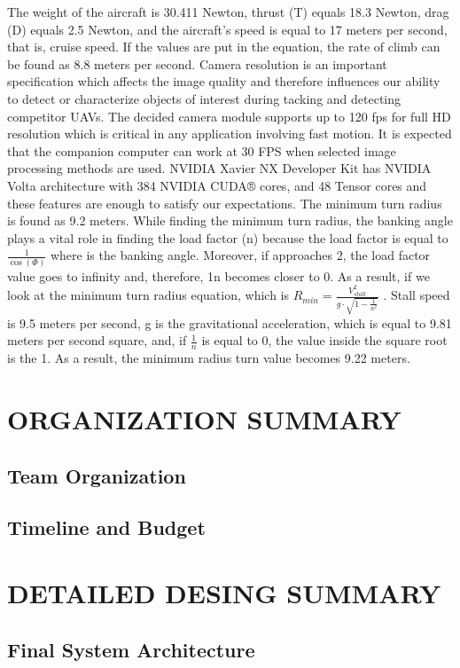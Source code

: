 \documentclass[12pt]{article}
\begin{document}
The weight of the aircraft is 30.411 Newton, thrust (T) equals 18.3 Newton, drag (D) equals 2.5 Newton, and the aircraft's speed is equal to 17 meters per second, that is, cruise speed. If the values are put in the equation, the rate of climb can be found as 8.8 meters per second.
\justify
Camera resolution is an important specification which affects the image quality and therefore influences our ability to detect or characterize objects of interest during tacking and detecting competitor UAVs. The decided camera module supports up to 120 fps for full HD resolution which is critical in any application involving fast motion.
\justify
It is expected that the companion computer can work at 30 FPS when selected image processing methods are used. NVIDIA Xavier NX Developer Kit has NVIDIA Volta architecture with 384 NVIDIA CUDA® cores, and 48 Tensor cores and these features are enough to satisfy our expectations. 
\justify
The minimum turn radius is found as 9.2 meters. While finding the minimum turn radius, the banking angle plays a vital role in finding the load factor (n) because the load factor is equal to $\frac{1}{\cos(\Phi)}$ where \Phi is the banking angle. Moreover, if \Phi  approaches 2, the load factor value goes to infinity and, therefore, 1n becomes closer to 0. As a result, if we look at the minimum turn radius equation, which is $R_{min}=\frac{V^2_{stall}}{g \cdot \sqrt{1-\frac{1}{n^2}}}$ . Stall speed is 9.5 meters per second, g is the gravitational acceleration, which is equal to 9.81 meters per second square, and, if $\frac{1}{n}$ is equal to 0, the value inside the square root is the 1. As a result, the minimum radius turn value becomes 9.22 meters.


\section{ORGANIZATION SUMMARY}
\subsection{Team Organization}
\subsection{Timeline and Budget}

\section{DETAILED DESING SUMMARY}
\subsection{Final System Architecture}
\end{document}
